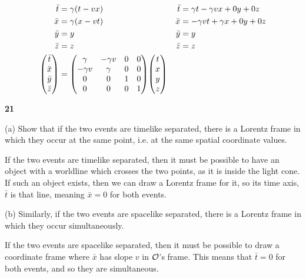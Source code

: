 \documentclass[gr-notes.tex]{subfiles}
\begin{document}
\begin{align*}
  \bar{t} &= \gamma (t - v x) &
  \bar{t} &= \gamma t - \gamma v x + 0 y + 0 z
  \\
  \bar{x} &=  \gamma (x - v t) &
  \bar{x} &= -\gamma v t + \gamma x + 0 y + 0 z
  \\
  \bar{y} &= y & \bar{y} &= y
  \\
  \bar{z} &= z & \bar{z} &= z
  \\
  \mqty( \bar{t} \\ \bar{x} \\ \bar{y} \\ \bar{z} ) &=
  \mqty( \gamma   & -\gamma v & 0 & 0 \\
        -\gamma v &  \gamma   & 0 & 0 \\
         0        &  0        & 1 & 0 \\
         0        &  0        & 0 & 1 )
  \mqty( t \\ x \\ y \\ z )
\end{align*}


\textbf{21}

(a) Show that if the two events are timelike separated, there is a Lorentz frame in which they occur at the same point, i.e. at the same spatial coordinate values.

If the two events are timelike separated, then it must be possible to have an object with a worldline which crosses the two points, as it is inside the light cone. If such an object exists, then we can draw a Lorentz frame for it, so its time axis, $\bar{t}$ is that line, meaning $\bar{x} = 0$ for both events.


(b) Similarly, if the two events are spacelike separated, there is a Lorentz frame in which they occur simultaneously.

If the two events are spacelike separated, then it must be possible to draw a coordinate frame where $\bar{x}$ has slope $v$ in $\mathcal{O}$'s frame. This means that $\bar{t} = 0$ for both events, and so they are simultaneous.
\end{document}

